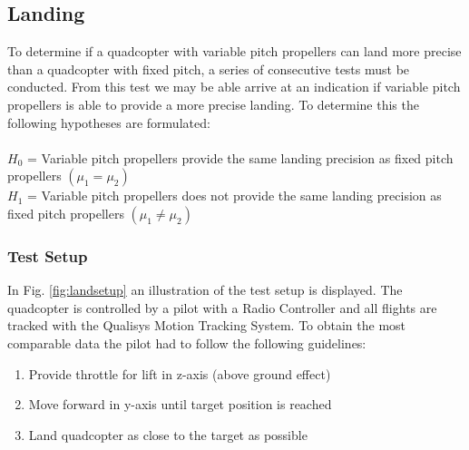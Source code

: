 \subsection{Landing}
To determine if a quadcopter with variable pitch propellers can land more precise than a quadcopter with fixed pitch, a series of consecutive tests must be conducted. From this test we may be able arrive at an indication if variable pitch propellers is able to provide a more precise landing. To determine this the following hypotheses are formulated:\\
\\
$H_0$ = Variable pitch propellers provide the same landing precision as fixed pitch propellers $(\mu_1 = \mu_2 )$\\
$H_1$ = Variable pitch propellers does not provide the same landing precision as fixed pitch propellers $(\mu_1 \neq \mu_2 )$\\

\subsubsection{Test Setup}
In Fig. \ref{fig:landsetup} an illustration of the test setup is displayed. The quadcopter is controlled by a pilot with a Radio Controller and all flights are tracked with the Qualisys Motion Tracking System. To obtain the most comparable data the pilot had to follow the following guidelines:
\begin{enumerate}
  \item Provide throttle for lift in z-axis (above ground effect)
  \item Move forward in y-axis until target position is reached
  \item Land quadcopter as close to the target as possible
\end{enumerate}\\

